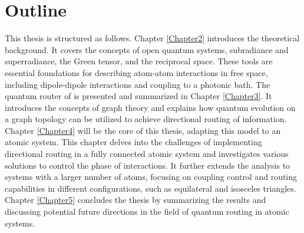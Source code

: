     \section{Outline}
This thesis is structured as follows.
Chapter \ref{Chapter2} introduces the theoretical background.
It covers the concepts of open quantum systems,
subradiance and superradiance, the Green tensor, and the reciprocal space.
These tools are essential foundations for describing atom-atom interactions in free space,
including dipole-dipole interactions and coupling to a photonic bath.
The quantum router of \cite{Startingpoint} is presented and summarized in Chapter \ref{Chapter3}.
It introduces the concepts of graph theory and explains how quantum evolution on a graph topology can be utilized to achieve directional routing of information.
Chapter \ref{Chapter4} will be the core of this thesis, adapting this model to an atomic system.
This chapter delves into the challenges of implementing directional routing in a fully connected atomic system and investigates various solutions to control the phase of interactions.
It further extends the analysis to systems with a larger number of atoms, focusing on coupling control and routing capabilities in different configurations, such as equilateral and isosceles triangles.
Chapter \ref{Chapter5} concludes the thesis by summarizing the results and discussing potential future directions in the field of quantum routing in atomic systems.